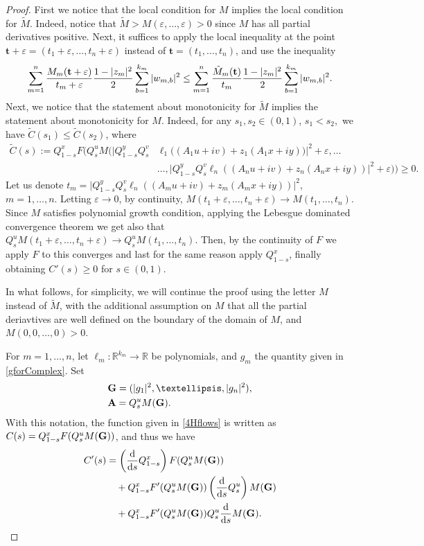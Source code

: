 \documentclass[10pt,a4paper]{amsart}
\newcommand{\R}{\mathbb{R}}
\begin{document}
\begin{proof}
		First we notice that the local condition for $M$ implies the local condition for $\tilde{M}$. Indeed, notice that $\tilde{M} > M(\varepsilon, \ldots, \varepsilon) > 0$ since $M$ has all partial derivatives positive. Next, it suffices to apply the local inequality at the point $\mathbf{t} + \varepsilon = (t_1 + \varepsilon, \ldots, t_n + \varepsilon)$ instead of $\mathbf{t} = (t_1, \ldots, t_n)$, and use the inequality
		\begin{align*}
			\sum_{m=1}^n\frac{M_{m}({\bf{t}}+\varepsilon)}{t_m+\varepsilon}\frac{1-|z_m|^2}{2}\sum_{b=1}^{k_m}|w_{m,b}|^2\leq 	\sum_{m=1}^n\frac{\tilde{M}_{m}({\bf{t}})}{t_m}\frac{1-|z_m|^2}{2}\sum_{b=1}^{k_m}|w_{m,b}|^2.
		\end{align*}
		Next, we notice that the statement about  monotonicity for $\tilde{M}$ implies the statement about monotonicity for $M$. Indeed, for any $s_{1}, s_{2} \in (0,1)$, $s_{1}<s_{2},$ we have $\tilde{C}(s_{1})\leq \tilde{C}(s_{2})$, where 
		\begin{align*}
			\tilde{C}(s):=Q_{1-s}^x F\big(Q_s^uM\big(\big|Q_{1-s}^yQ_s^v&\ell_1((A_1u+iv)+z_1(A_1x+iy)\big)\big|^2+\varepsilon,\ldots\\
			&\ldots,\big|Q_{1-s}^yQ_s^v\ell_n((A_n u+iv)+z_n(A_n x+iy))\big|^2+\varepsilon\big)\big)\geq0.
		\end{align*}
		Let us denote $t_m=\big|Q_{1-s}^yQ_s^v\ell_n((A_m u+iv)+z_m(A_m x+iy))\big|^2$, $m=1,\ldots,n$. Letting $\varepsilon \to 0$, by continuity, $M(t_1 + \varepsilon, \ldots, t_n + \varepsilon) \to M(t_1, \ldots, t_n)$. Since $M$  satisfies polynomial growth condition, applying the Lebesgue dominated convergence theorem we get also that $Q_s^{u}M(t_1+\varepsilon,\ldots,t_n+\varepsilon)\to Q_s^{u}M(t_1,\ldots,t_n)$. Then, by the continuity of $F$ we apply $F$ to this converges and last for the same reason apply $Q_{1-s}^x$, finally obtaining $C'(s) \geq 0$ for $s \in (0,1)$. 
        
        In what follows, for simplicity, we will continue the proof using the letter $M$ instead of $\tilde{M}$, with the additional assumption on $M$ that all the partial deriavtives are well defined on the boundary of the domain of $M$, and $M(0,0, \ldots, 0)>0$.
		
		For $m=1,\ldots,n$, let $\ell_m:\R^{k_m}\to\R$ be polynomials,  and $g_m$ the quantity given in \eqref{gforComplex}. Set
				\begin{align*}
			&{\bf{G}}=(|g_1|^2,\ldots,|g_n|^2),\\
			&{\bf{A}}=Q_{s}^{u}M({\bf{G}}).
		\end{align*}
		With this notation, the function given in \eqref{4Hflows} is written as $C(s)=Q_{1-s}^xF(Q_{s}^{u}M({\bf{G}}))$, and thus we have 
        \begin{align*}
	C'(s)&=\left(\frac{\mathrm{d}}{\mathrm{d}s}Q_{1-s}^x\right)F(Q_{s}^{u}M({\bf{G}}))\\
	&\quad+Q_{1-s}^xF'(Q_{s}^{u}M({\bf{G}}))\left(\frac{\mathrm{d}}{\mathrm{d} s}Q_s^u\right)M({\bf{G}}) \\
	&\quad+Q_{1-s}^xF'(Q_{s}^{u}M({\bf{G}})) Q_s^u\frac{\mathrm{d}}{\mathrm{d} s} M({\bf{G}}).
\end{align*}


\end{proof}
\end{document}
